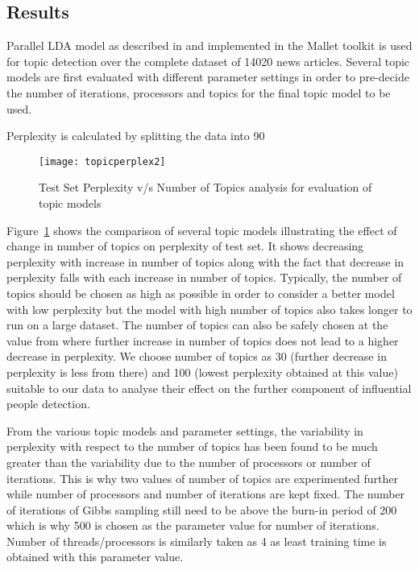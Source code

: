 \subsection{Results}

Parallel LDA model as described in \cite{newman2009distributed} and implemented in the Mallet\cite{McCallumMALLET} toolkit is used for topic detection over the complete dataset of 14020 news articles. 
Several topic models are first evaluated with different parameter settings in order to pre-decide the number of iterations, processors and topics for the final topic model to be used.

Perplexity is calculated by splitting the data into 90%

\begin{figure}[h]
\begin{center}
\texttt{[image: topicperplex2]}
\caption{Test Set Perplexity v/s Number of Topics analysis for evaluation of topic models}
\label{figure:perplex}
\end{center}
\end{figure}

Figure~\ref{figure:perplex} shows the comparison of several topic models illustrating the effect of change in number of topics on perplexity of test set. It shows decreasing perplexity with increase in number of topics along with the fact that decrease in perplexity falls with each increase in number of topics. Typically, the number of topics should be chosen as high as possible in order to consider a better model with low perplexity but the model with high number of topics also takes longer to run on a large dataset. The number of topics can also be safely chosen at the value from where further increase in number of topics does not lead to a higher decrease in perplexity. We choose number of topics as 30 (further decrease in perplexity is less from there) and 100 (lowest perplexity obtained at this value) suitable to our data to analyse their effect on the further component of influential people detection.

From the various topic models and parameter settings, the variability in perplexity with respect to the number of topics has been found to be much greater than the variability due to the number of processors or number of iterations. This is why two values of number of topics are experimented further while number of processors and number of iterations are kept fixed. The number of iterations of Gibbs sampling still need to be above the burn-in period of 200 which is why 500 is chosen as the parameter value for number of iterations. Number of threads/processors is similarly taken as 4 as least training time is obtained with this parameter value. 

